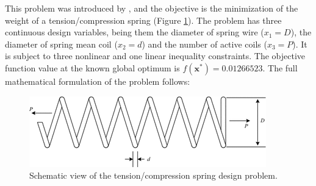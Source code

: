 


This problem was introduced by \cite{TC}, and the objective is the minimization of the weight of a tension/compression spring (Figure \ref{fig:TC}). The problem has three continuous design variables, being them the diameter of spring wire ($x_1 = D$), the diameter of spring mean coil ($x_2 = d$) and the number of active coils ($x_3 = P$). It is subject to three nonlinear and one linear inequality constraints. The objective function value at the known global optimum is $f(\bm{x}^*) = 0.01266523$. The full mathematical formulation of the problem follows:

\vspace{-0.5cm}



\vspace{0.5cm}


\begin{figure}[h]
\begin{center}
\includegraphics[scale=0.6]{img/Problems/TC.png}
\end{center}
\captionsetup{justification=centering}
\caption{Schematic view of the tension/compression spring design problem.}\label{fig:TC}
\end{figure}

